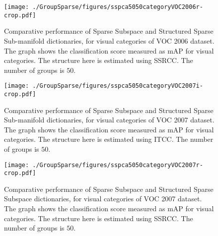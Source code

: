 \begin{figure}
 \centering
 \texttt{[image: ./GroupSparse/figures/sspca5050categoryVOC2006r-crop.pdf]}
 \caption[Comparison of Sparse Subspace and SSRCC Structured Sparse dictionaries using VOC-2006 dataset]{Comparative performance of Sparse Subspace and Structured Sparse Sub-manifold dictionaries, for visual categories of VOC 2006 dataset. The graph shows the classification score measured as mAP for visual categories. The structure here is estimated using SSRCC. The number of groups is $50$.}
 \label{fig:sspca2006r}
\end{figure}

\begin{figure}
 \centering
 \texttt{[image: ./GroupSparse/figures/sspca5050categoryVOC2007i-crop.pdf]}
 \caption[Comparison of Sparse Subspace and ITCC Structured Sparse Subspace dictionaries using VOC-2007 dataset]{Comparative performance of Sparse Subspace and Structured Sparse Sub-manifold dictionaries, for visual categories of VOC 2007 dataset. The graph shows the classification score measured as mAP for visual categories. The structure here is estimated using ITCC. The number of groups is $50$.}
 \label{fig:sspca2007i}
\end{figure}

\begin{figure}
 \centering
 \texttt{[image: ./GroupSparse/figures/sspca5050categoryVOC2007r-crop.pdf]}
 \caption[Comparison of Sparse Subspace and SSRCC Structured Sparse Subspace dictionaries using VOC-2007 dataset]{Comparative performance of Sparse Subspace and Structured Sparse Subspace dictionaries, for visual categories of VOC 2007 dataset. The graph shows the classification score measured as mAP for visual categories. The structure here is estimated using SSRCC. The number of groups is $50$.}
 \label{fig:sspca2007r}
\end{figure}

